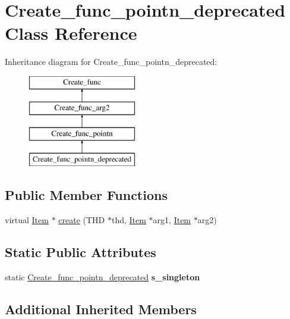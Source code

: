 \hypertarget{classCreate__func__pointn__deprecated}{}\section{Create\+\_\+func\+\_\+pointn\+\_\+deprecated Class Reference}
\label{classCreate__func__pointn__deprecated}
Inheritance diagram for Create\+\_\+func\+\_\+pointn\+\_\+deprecated\+:\begin{figure}[H]
\begin{center}
\leavevmode
\includegraphics[height=4.000000cm]{classCreate__func__pointn__deprecated}
\end{center}
\end{figure}
\subsection*{Public Member Functions}
\begin{DoxyCompactItemize}
\item 
virtual \mbox{\hyperlink{classItem}{Item}} $\ast$ \mbox{\hyperlink{classCreate__func__pointn__deprecated_a97db1709887f5b9ae18bd496e20d8c1f}{create}} (T\+HD $\ast$thd, \mbox{\hyperlink{classItem}{Item}} $\ast$arg1, \mbox{\hyperlink{classItem}{Item}} $\ast$arg2)
\end{DoxyCompactItemize}
\subsection*{Static Public Attributes}
\begin{DoxyCompactItemize}
\item 
\mbox{\label{classCreate__func__pointn__deprecated_a41895b1b85a63c08489ce2866c5c0c87}} 
static \mbox{\hyperlink{classCreate__func__pointn__deprecated}{Create\+\_\+func\+\_\+pointn\+\_\+deprecated}} {\bfseries s\+\_\+singleton}
\end{DoxyCompactItemize}
\subsection*{Additional Inherited Members}


